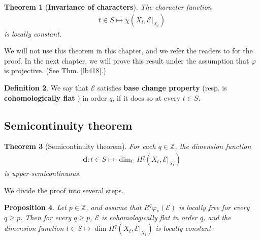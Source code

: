 \documentclass[12pt,b5paper,notitlepage]{report}
\theoremstyle{definition}
\newtheorem{df}{Definition}[section]
\theoremstyle{plain}
\newtheorem{thm}[df]{Theorem}
\newtheorem{pp}[df]{Proposition}
\newcommand{\scr}{\mathscr}
\newcommand{\mbf}{\mathbf}
\newcommand{\Cbb}{\mathbb C}
\newcommand{\Zbb}{\mathbb Z}
\numberwithin{equation}{section}
\begin{document}
\begin{thm}[\textbf{Invariance of characters}]
The character function
\begin{align*}
t\in S\mapsto \chi(X_t,\scr E|_{X_t})
\end{align*}
is locally constant.
\end{thm}


We will not use this theorem in this chapter, and we refer the readers to \cite[Sec. III.4]{BS} for the proof. In the next chapter, we will prove this result under the assumption that $\varphi$ is projective. (See Thm. \ref{lb418}.)



\begin{df}
We say that $\scr E$ satisfies \textbf{base change property} (resp. is \textbf{cohomologically flat} ) in order $q$, if it does so at every $t\in S$.  
\end{df}


 











\subsection{Semicontinuity theorem}

\begin{thm}[Semicontinuity theorem] \label{lb347}
For each $q\in\Zbb$, the dimension function
\begin{align}
\mbf d:t\in S\mapsto \dim_\Cbb H^q(X_t,\scr E|_{X_t}) \label{eq181}
\end{align}
is upper-semicontinuous.
\end{thm}

We divide the proof into several steps.



\begin{pp}\label{lb350}
Let $p\in\Zbb$, and assume that $R^q\varphi_*(\scr E)$ is locally free for every $q\geq p$. Then for every $q\geq p$, $\scr E$ is cohomologically flat in order $q$, and the dimension function $t\in S\mapsto \dim H^q(X_t,\scr E|_{X_t})$ is locally constant.
\end{pp}
\end{document}
